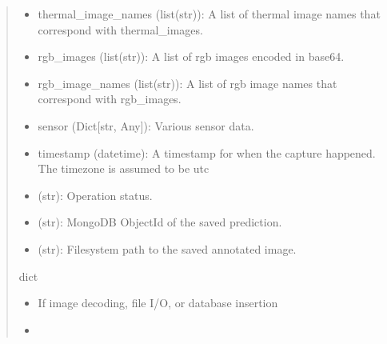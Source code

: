\documentclass[letterpaper,10pt,english]{sphinxmanual}
\begin{document}
\begin{fulllineitems}
\begin{quote}
\begin{description}
\begin{itemize}
\item {} 
\sphinxAtStartPar
thermal\_image\_names (list(str)): A list of thermal image names that correspond with thermal\_images.

\item {} 
\sphinxAtStartPar
rgb\_images (list(str)): A list of rgb images encoded in base64.

\item {} 
\sphinxAtStartPar
rgb\_image\_names (list(str)): A list of rgb image names that correspond with rgb\_images.

\item {} 
\sphinxAtStartPar
sensor (Dict{[}str, Any{]}): Various sensor data.

\item {} 
\sphinxAtStartPar
timestamp (datetime): A timestamp for when the capture happened. The timezone is assumed to be utc

\end{itemize}


\sphinxAtStartPar
\begin{description}
\begin{itemize}
\item {} 
\sphinxAtStartPar
{} (str): Operation status.

\item {} 
\sphinxAtStartPar
{} (str): MongoDB ObjectId of the saved prediction.

\item {} 
\sphinxAtStartPar
{} (str): Filesystem path to the saved annotated image.

\end{itemize}

\end{description}


\sphinxAtStartPar
dict

\begin{itemize}
\item {} 
\sphinxAtStartPar
{} \textendash{} If image decoding, file I/O, or database insertion

\item {} 
\sphinxAtStartPar
{} \textendash{} 

\end{itemize}

\end{description}\end{quote}

\end{fulllineitems}
\end{document}
